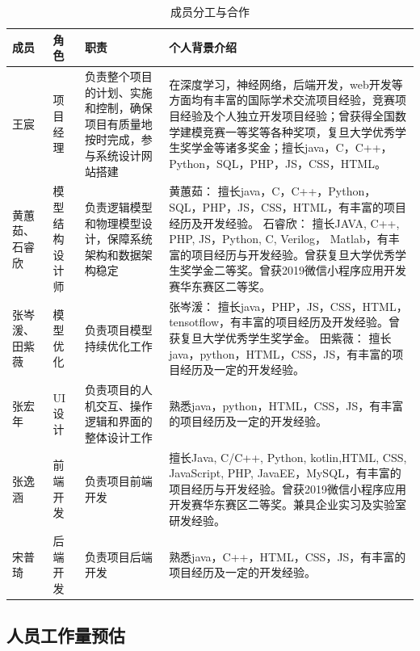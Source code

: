 \documentclass[hyperref, a4paper]{ctexart}
\begin{document}
\begin{table}[H]
\small 
\begin{center}  
\begin{tabular}{|p{1.5cm}|p{3cm}|p{5cm}||p{5cm}|}  
\hline 
成员 & 角色 & 职责 & 个人背景介绍    \\ \hline  
王宸 & 项目经理 & 负责整个项目的计划、实施和控制，确保项目有质量地按时完成，参与系统设计网站搭建 
& 在深度学习，神经网络，后端开发，web开发等方面均有丰富的国际学术交流项目经验，竞赛项目经验及个人独立开发项目经验；曾获得全国数学建模竞赛一等奖等各种奖项，复旦大学优秀学生奖学金等诸多奖金；擅长java，C，C++，Python，SQL，PHP，JS，CSS，HTML。    \\ \hline
黄蕙茹、石睿欣  & 模型结构设计师&负责逻辑模型和物理模型设计，保障系统架构和数据架构稳定 &黄蕙茹：
擅长java，C，C++，Python，SQL，PHP，JS，CSS，HTML，有丰富的项目经历及开发经验。
石睿欣： 擅长JAVA, C++, PHP, JS，Python, C, Verilog， Matlab，有丰富的项目经历与开发经验。曾获复旦大学优秀学生奖学金二等奖。曾获2019微信小程序应用开发赛华东赛区二等奖。    \\ \hline
张岑湲、田紫薇& 模型优化 & 负责项目模型持续优化工作 & 张岑湲：
擅长java，PHP，JS，CSS，HTML，tensotflow，有丰富的项目经历及开发经验。曾获复旦大学优秀学生奖学金。 田紫薇：
擅长java，python，HTML，CSS，JS，有丰富的项目经历及一定的开发经验。\\ \hline
张宏年 & UI设计 & 负责项目的人机交互、操作逻辑和界面的整体设计工作 & 
熟悉java，python，HTML，CSS，JS，有丰富的项目经历及一定的开发经验。\\ \hline
张逸涵 & 前端开发 & 负责项目前端开发 & 擅长Java, C/C++, Python, kotlin,HTML, CSS, JavaScript, PHP, JavaEE，MySQL，有丰富的项目经历与开发经验。曾获2019微信小程序应用开发赛华东赛区二等奖。兼具企业实习及实验室研发经验。 \\ \hline
宋普琦 & 后端开发 & 负责项目后端开发 & 熟悉java，C++，HTML，CSS，JS，有丰富的项目经历及一定的开发经验。 \\ \hline


\end{tabular}  
\caption{成员分工与合作} 
\end{center}  
\end{table}

\hypertarget{ux4ebaux5458ux5de5ux4f5cux91cfux9884ux4f30}{%
\subsection{人员工作量预估}\label{ux4ebaux5458ux5de5ux4f5cux91cfux9884ux4f30}}
\end{document}
